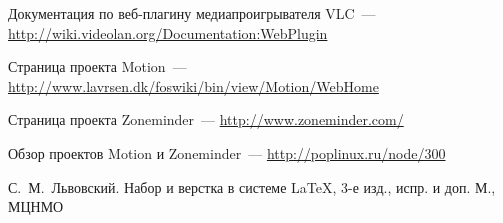 \begin{thebibliography}{2013}
  Документация по веб-плагину медиапроигрывателя VLC~---
  \url{http://wiki.videolan.org/Documentation:WebPlugin}

  Страница проекта Motion~---
  \url{http://www.lavrsen.dk/foswiki/bin/view/Motion/WebHome}

  Страница проекта Zoneminder~---
  \url{http://www.zoneminder.com/}

  Обзор проектов Motion и Zoneminder~---
  \url{http://poplinux.ru/node/300}

\by С.~М.~Львовский.
\book Набор и верстка в системе \LaTeX, 3-е изд., испр. и доп.
\publaddr М., МЦНМО

\end{thebibliography}

\endinput
